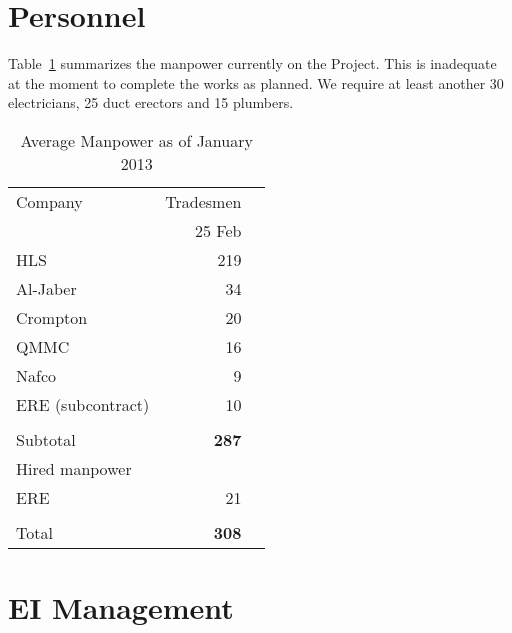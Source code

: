 \section*{Personnel}


 Table~\ref{personnel} summarizes the manpower currently on the Project. This is inadequate at the moment to complete the works as planned. We require at least another 30 electricians, 25 duct erectors and 15 plumbers.

\def\Z{\phantom{Z}}
\begin{table}[htbp]
\begin{center}
\begin{tabular}{l r r}
\toprule
Company           &Tradesmen  \\
~                 &25 Feb \\
\midrule
HLS                &219         \\
Al-Jaber          &34         \\
Crompton        &20           \\
QMMC            &16        \\
Nafco             &9           \\
ERE (subcontract)               &10          \\
                 
                  &\underline{\phantom{1075}}\\
Subtotal          &\textbf{287}        \\

Hired manpower    &         \\
\Z ERE            &21        \\
          
                 
&&\\
Total                      &\textbf{308}       \\
                           
\bottomrule
\end{tabular}
\caption{Average Manpower as of January 2013}
\label{personnel}
\end{center}
\end{table}



\section*{EI Management}

